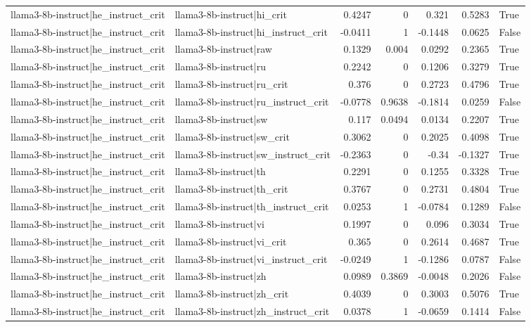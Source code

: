 \begin{table}
\begin{tabular}{l l r r r r l}
llama3-8b-instruct|he_instruct_crit & llama3-8b-instruct|hi_crit & 0.4247 & 0 & 0.321 & 0.5283 & True \\
llama3-8b-instruct|he_instruct_crit & llama3-8b-instruct|hi_instruct_crit & -0.0411 & 1 & -0.1448 & 0.0625 & False \\
llama3-8b-instruct|he_instruct_crit & llama3-8b-instruct|raw & 0.1329 & 0.004 & 0.0292 & 0.2365 & True \\
llama3-8b-instruct|he_instruct_crit & llama3-8b-instruct|ru & 0.2242 & 0 & 0.1206 & 0.3279 & True \\
llama3-8b-instruct|he_instruct_crit & llama3-8b-instruct|ru_crit & 0.376 & 0 & 0.2723 & 0.4796 & True \\
llama3-8b-instruct|he_instruct_crit & llama3-8b-instruct|ru_instruct_crit & -0.0778 & 0.9638 & -0.1814 & 0.0259 & False \\
llama3-8b-instruct|he_instruct_crit & llama3-8b-instruct|sw & 0.117 & 0.0494 & 0.0134 & 0.2207 & True \\
llama3-8b-instruct|he_instruct_crit & llama3-8b-instruct|sw_crit & 0.3062 & 0 & 0.2025 & 0.4098 & True \\
llama3-8b-instruct|he_instruct_crit & llama3-8b-instruct|sw_instruct_crit & -0.2363 & 0 & -0.34 & -0.1327 & True \\
llama3-8b-instruct|he_instruct_crit & llama3-8b-instruct|th & 0.2291 & 0 & 0.1255 & 0.3328 & True \\
llama3-8b-instruct|he_instruct_crit & llama3-8b-instruct|th_crit & 0.3767 & 0 & 0.2731 & 0.4804 & True \\
llama3-8b-instruct|he_instruct_crit & llama3-8b-instruct|th_instruct_crit & 0.0253 & 1 & -0.0784 & 0.1289 & False \\
llama3-8b-instruct|he_instruct_crit & llama3-8b-instruct|vi & 0.1997 & 0 & 0.096 & 0.3034 & True \\
llama3-8b-instruct|he_instruct_crit & llama3-8b-instruct|vi_crit & 0.365 & 0 & 0.2614 & 0.4687 & True \\
llama3-8b-instruct|he_instruct_crit & llama3-8b-instruct|vi_instruct_crit & -0.0249 & 1 & -0.1286 & 0.0787 & False \\
llama3-8b-instruct|he_instruct_crit & llama3-8b-instruct|zh & 0.0989 & 0.3869 & -0.0048 & 0.2026 & False \\
llama3-8b-instruct|he_instruct_crit & llama3-8b-instruct|zh_crit & 0.4039 & 0 & 0.3003 & 0.5076 & True \\
llama3-8b-instruct|he_instruct_crit & llama3-8b-instruct|zh_instruct_crit & 0.0378 & 1 & -0.0659 & 0.1414 & False \\

\end{tabular}
\end{table}
